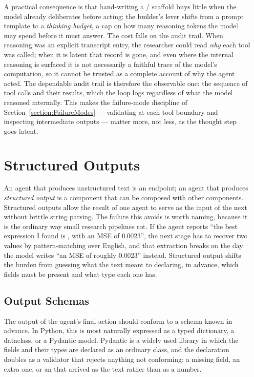 A practical consequence is that hand-writing a / scaffold buys little when the model already deliberates before acting; the builder's lever shifts from a prompt template to a \emph{thinking budget}, a cap on how many reasoning tokens the model may spend before it must answer.
The cost falls on the audit trail.
When reasoning was an explicit transcript entry, the researcher could read \emph{why} each tool was called; when it is latent that record is gone, and even where the internal reasoning is surfaced it is not necessarily a faithful trace of the model's computation, so it cannot be trusted as a complete account of why the agent acted.
The dependable audit trail is therefore the observable one: the sequence of tool calls and their results, which the loop logs regardless of what the model reasoned internally.
This makes the failure-mode discipline of Section~\ref{section:FailureModes} --- validating at each tool boundary and inspecting intermediate outputs --- matter more, not less, as the thought step goes latent.

\section{Structured Outputs}
\label{section:StructuredOutputs}

An agent that produces unstructured text is an endpoint; an agent that produces \emph{structured output} is a component that can be composed with other components.
Structured outputs allow the result of one agent to serve as the input of the next without brittle string parsing.
The failure this avoids is worth naming, because it is the ordinary way small research pipelines rot.
If the agent reports ``the best expression I found is , with an MSE of 0.0023'', the next stage has to recover two values by pattern-matching over English, and that extraction breaks on the day the model writes ``an MSE of roughly 0.0023'' instead.
Structured output shifts the burden from guessing what the text meant to declaring, in advance, which fields must be present and what type each one has.

\subsection{Output Schemas}

The output of the agent's final action should conform to a schema known in advance.
In Python, this is most naturally expressed as a typed dictionary, a dataclass, or a Pydantic model.
Pydantic is a widely used library in which the fields and their types are declared as an ordinary class,
and the declaration doubles as a validator that rejects anything not conforming: a missing field, an extra one, or an  that arrived as the text  rather than as a number.

